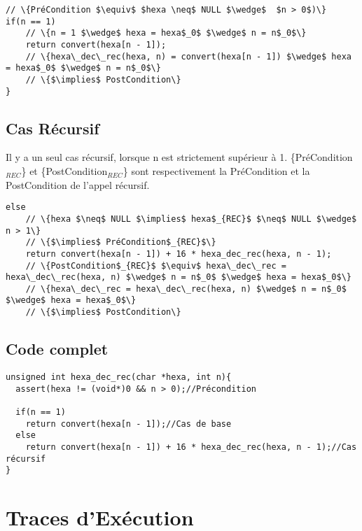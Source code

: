 \documentclass[a4paper, 11pt, oneside]{article}
\begin{document}
\begin{lstlisting}
// \{PréCondition $\equiv$ $hexa \neq$ NULL $\wedge$  $n > 0$)\}
if(n == 1)
    // \{n = 1 $\wedge$ hexa = hexa$_0$ $\wedge$ n = n$_0$\}
    return convert(hexa[n - 1]);
    // \{hexa\_dec\_rec(hexa, n) = convert(hexa[n - 1]) $\wedge$ hexa = hexa$_0$ $\wedge$ n = n$_0$\}
    // \{$\implies$ PostCondition\}
}
\end{lstlisting}

\subsection{Cas Récursif}
Il y a un seul cas récursif, lorsque n est strictement supérieur à 1.
\{PréCondition$_{REC}$\} et \{PostCondition$_{REC}$\} sont respectivement la PréCondition et la PostCondition de l'appel récursif.

\begin{lstlisting}
else
    // \{hexa $\neq$ NULL $\implies$ hexa$_{REC}$ $\neq$ NULL $\wedge$ n > 1\}
    // \{$\implies$ PréCondition$_{REC}$\}
    return convert(hexa[n - 1]) + 16 * hexa_dec_rec(hexa, n - 1);
    // \{PostCondition$_{REC}$ $\equiv$ hexa\_dec\_rec = hexa\_dec\_rec(hexa, n) $\wedge$ n = n$_0$ $\wedge$ hexa = hexa$_0$\}
    // \{hexa\_dec\_rec = hexa\_dec\_rec(hexa, n) $\wedge$ n = n$_0$ $\wedge$ hexa = hexa$_0$\}
    // \{$\implies$ PostCondition\}
\end{lstlisting}

\subsection{Code complet}

\begin{lstlisting}
unsigned int hexa_dec_rec(char *hexa, int n){
  assert(hexa != (void*)0 && n > 0);//Précondition

  if(n == 1)
    return convert(hexa[n - 1]);//Cas de base
  else
    return convert(hexa[n - 1]) + 16 * hexa_dec_rec(hexa, n - 1);//Cas récursif
}
\end{lstlisting}
\newpage
\section{Traces d'Exécution}\label{traces}
%
%

\end{document}
